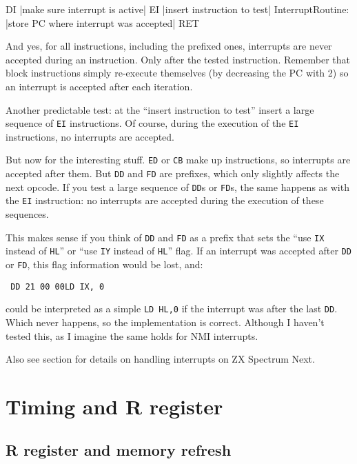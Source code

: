 \begin{tcblisting}{}
	DI
	|make sure interrupt is active|
	EI
	|insert instruction to test|
InterruptRoutine:
	|store PC where interrupt was accepted|
	RET
\end{tcblisting}

And yes, for all instructions, including the prefixed ones, interrupts are never accepted during an instruction. Only after the tested instruction. Remember that block instructions simply re-execute themselves (by decreasing the PC with 2) so an interrupt is accepted after each iteration.

Another predictable test: at the ``insert instruction to test'' insert a large sequence of {\tt EI} instructions. Of course, during the execution of the {\tt EI} instructions, no interrupts are accepted. 

\pagebreak %
But now for the interesting stuff. {\tt ED} or {\tt CB} make up instructions, so interrupts are accepted after them. But {\tt DD} and {\tt FD} are prefixes, which only slightly affects the next opcode. If you test a large sequence of {\tt DD}s or {\tt FD}s, the same happens as with the {\tt EI} instruction: no interrupts are accepted during the execution of these sequences.

This makes sense if you think of {\tt DD} and {\tt FD} as a prefix that sets the ``use {\tt IX} instead of {\tt HL}'' or ``use {\tt IY} instead of {\tt HL}'' flag. If an interrupt was accepted after {\tt DD} or {\tt FD}, this flag information would be lost, and:

{\tt 
	{\qquad}DD 21 00 00{\qquad}LD IX, 0
}

could be interpreted as a simple {\tt LD HL,0} if the interrupt was after the last {\tt DD}. Which never happens, so the implementation is correct. Although I haven't tested this, as I imagine the same holds for NMI interrupts.

Also see section  for details on handling interrupts on ZX Spectrum Next.


\section{Timing and R register}

\subsection{R register and memory refresh}

